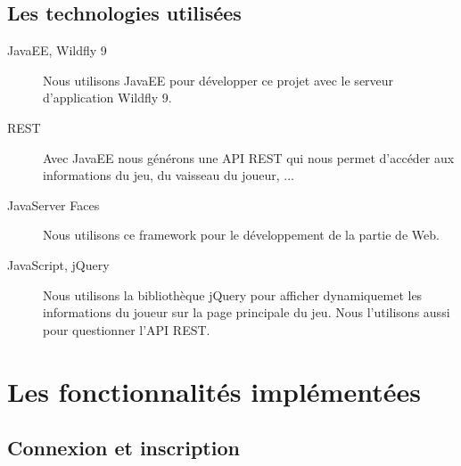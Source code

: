 \documentclass[a4paper,11pt]{report}
\begin{document}
    \subsection{Les technologies utilisées}
      \begin{description}
        \item[JavaEE, Wildfly 9] Nous utilisons JavaEE pour développer ce projet avec le serveur d'application Wildfly 9.
        \item[REST] Avec JavaEE nous générons une API REST qui nous permet d'accéder aux informations du jeu, du vaisseau du joueur, ...
        \item[JavaServer Faces] Nous utilisons ce framework pour le développement de la partie de Web.
        \item[JavaScript, jQuery] Nous utilisons la bibliothèque jQuery pour afficher dynamiquemet les informations du joueur sur la page principale du jeu. Nous l'utilisons aussi pour questionner l'API REST.
      \end{description}

  \section{Les fonctionnalités implémentées}

    \subsection{Connexion et inscription}
  
\end{document}
